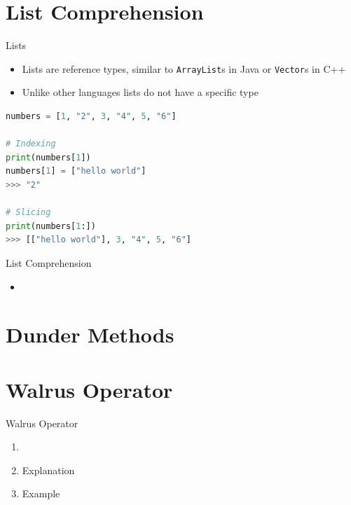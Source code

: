\documentclass[aspectratio=169,xcolor=dvipsnames]{beamer}
\begin{document}
\section{List Comprehension}

\begin{frame}[fragile]{Lists}
  \begin{itemize}
    \item Lists are reference types, similar to \texttt{ArrayList}s in Java or \texttt{Vector}s in C++
    \item Unlike other languages lists do not have a specific type
  \end{itemize}
  \begin{example}
    \begin{lstlisting}[language=Python]
numbers = [1, "2", 3, "4", 5, "6"]

# Indexing
print(numbers[1])
numbers[1] = ["hello world"]
>>> "2"

# Slicing
print(numbers[1:])
>>> [["hello world"], 3, "4", 5, "6"]
    \end{lstlisting}
  \end{example}
\end{frame}


\begin{frame}{List Comprehension}
  \begin{itemize}
    \item
  \end{itemize}
\end{frame}

\section{Dunder Methods}

\section{Walrus Operator}

\begin{frame}{Walrus Operator}
    \begin{enumerate}
        \item
        \item Explanation
        \item Example
    \end{enumerate}
\end{frame}
\end{document}
